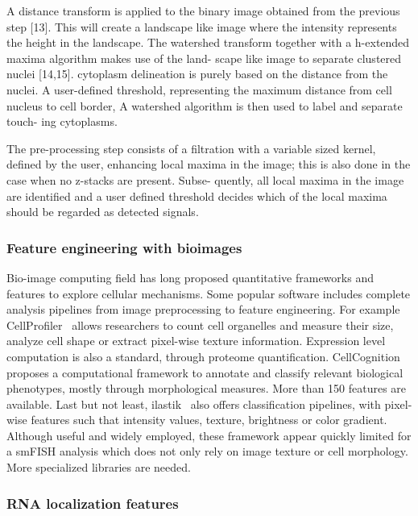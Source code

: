 A distance transform is applied to the binary image obtained from the previous step [13].
This will create a landscape like image where the intensity represents the height in the landscape. The watershed transform together
with a h-extended maxima algorithm makes use of the land- scape like image to separate clustered nuclei [14,15].
cytoplasm delineation is purely based on the distance from the nuclei.
A user-defined threshold, representing the maximum distance from cell nucleus to cell border,
A watershed algorithm is then used to label and separate touch- ing cytoplasms.

The pre-processing step consists of a filtration with a variable sized kernel,
defined by the user, enhancing local maxima in the image; this is also done in
the case when no z-stacks are present. Subse- quently, all local maxima in the
image are identified and a user defined threshold decides which of the local maxima should be regarded as detected signals.



\subsubsection{Feature engineering with bioimages}

Bio-image computing field has long proposed quantitative frameworks and features to explore cellular mechanisms.
Some popular software includes complete analysis pipelines from image preprocessing to feature engineering.
For example CellProfiler~\cite{mcquin_cellprofiler_2018} allows researchers to count cell organelles and measure their size, analyze cell shape or extract pixel-wise texture information.
Expression level computation is also a standard, through proteome quantification.
CellCognition~\cite{held_cellcognition_2010} proposes a computational framework to annotate and classify relevant biological phenotypes, mostly through morphological measures.
More than 150 features are available.
Last but not least, ilastik~\cite{berg_ilastik_2019} also offers classification pipelines, with pixel-wise features such that intensity values, texture, brightness or color gradient.
Although useful and widely employed, these framework appear quickly limited for a \ac{smFISH} analysis which does not only rely on image texture or cell morphology.
More specialized libraries are needed.

\subsubsection{\ac{RNA} localization features}

